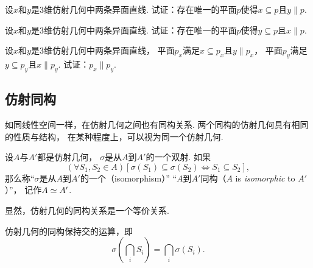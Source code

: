 \begin{example}
设\(x\)和\(y\)是3维仿射几何中两条异面直线.
试证：存在唯一的平面\(p\)使得\(x \subseteq p\)且\(y \parallel p\).
\end{example}

\begin{example}
设\(x\)和\(y\)是3维仿射几何中两条异面直线.
试证：存在唯一的平面\(p\)使得\(y \subseteq p\)且\(x \parallel p\).
\end{example}

\begin{example}
设\(x\)和\(y\)是3维仿射几何中两条异面直线，
平面\(p_x\)满足\(x \subseteq p_x\)且\(y \parallel p_x\)，
平面\(p_y\)满足\(y \subseteq p_y\)且\(x \parallel p_y\).
试证：\(p_x \parallel p_y\).
\end{example}

\subsection{仿射同构}
如同线性空间一样，在仿射几何之间也有同构关系.
两个同构的仿射几何具有相同的性质与结构，
在某种程度上，可以视为同一个仿射几何.

\begin{definition}
设\(A\)与\(A'\)都是仿射几何，
\(\sigma\)是从\(A\)到\(A'\)的一个双射.
如果\begin{equation*}
	(\forall S_1,S_2 \in A)
	[
		\sigma(S_1) \subseteq \sigma(S_2)
		\iff
		S_1 \subseteq S_2
	],
\end{equation*}
那么称“\(\sigma\)是从\(A\)到\(A'\)的一个（isomorphism）”
“\(A\)到\(A'\)同构（\(A\) is \emph{isomorphic} to \(A'\)）”，
记作\(A \simeq A'\).
\end{definition}

显然，仿射几何的同构关系是一个等价关系.

\begin{property}
仿射几何的同构保持交的运算，即\begin{equation*}
	\sigma\left( \bigcap_i S_i \right)
	= \bigcap_i \sigma(S_i).
\end{equation*}
\end{property}

